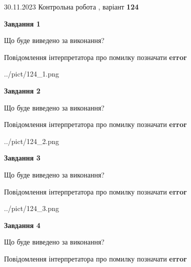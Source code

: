 \documentclass[12pt, ukrainian]{article}
\begin{document}
{{30.11.2023 Контрольна робота , варіант  \No \textbf { 124 }\par}}
{




{\begin {center}\textbf{Завдання 1}\end {center}}\par
Що буде виведено за виконання? \par
Повідомлення інтерпретатора про помилку позначати \textbf{error}

\begin{center}
	{../pict/124_1.png}
\end{center}
\newpage

{\begin {center}\textbf{Завдання 2}\end {center}}\par
Що буде виведено за виконання? \par
Повідомлення інтерпретатора про помилку позначати \textbf{error}

\begin{center}
	{../pict/124_2.png}
\end{center}
\newpage

{\begin {center}\textbf{Завдання 3}\end {center}}\par
Що буде виведено за виконання? \par
Повідомлення інтерпретатора про помилку позначати \textbf{error}

\begin{center}
	{../pict/124_3.png}
\end{center}
\newpage

{\begin {center}\textbf{Завдання 4}\end {center}}\par
Що буде виведено за виконання? \par
Повідомлення інтерпретатора про помилку позначати \textbf{error}

}
\end{document}
